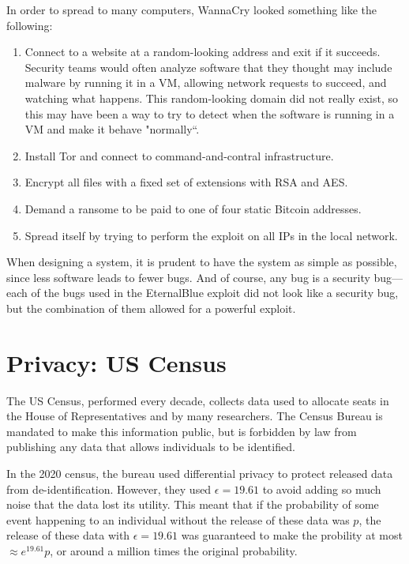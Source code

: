 In order to spread to many computers, WannaCry looked something like the following:
\begin{enumerate}
	\item Connect to a website at a random-looking address and exit if it succeeds. Security teams would often analyze software that they thought may include malware by running it in a VM, allowing network requests to succeed, and watching what happens. This random-looking domain did not really exist, so this may have been a way to try to detect when the software is running in a VM and make it behave "normally``. 
	\item Install Tor and connect to command-and-contral infrastructure.
	\item Encrypt all files with a fixed set of extensions with RSA and AES.
	\item Demand a ransome to be paid to one of four static Bitcoin addresses.
	\item Spread itself by trying to perform the exploit on all IPs in the local network.
\end{enumerate}

When designing a system, it is prudent to have the system as simple as possible, since less software leads to fewer bugs. And of course, any bug is a security bug---each of the bugs used in the EternalBlue exploit did not look like a security bug, but the combination of them allowed for a powerful exploit.

\section{Privacy: US Census}
The US Census, performed every decade, collects data used to allocate seats in the House of Representatives and by many researchers. The Census Bureau is mandated to make this information public, but is forbidden by law from publishing any data that allows individuals to be identified.

In the 2020 census, the bureau used differential privacy to protect released data from de-identification. However, they used $\epsilon = 19.61$ to avoid adding so much noise that the data lost its utility. This meant that if the probability of some event happening to an individual without the release of these data was $p$, the release of these data with $\epsilon = 19.61$ was guaranteed to make the probility at most $\approx e^{19.61} p$, or around a million times the original probability.

